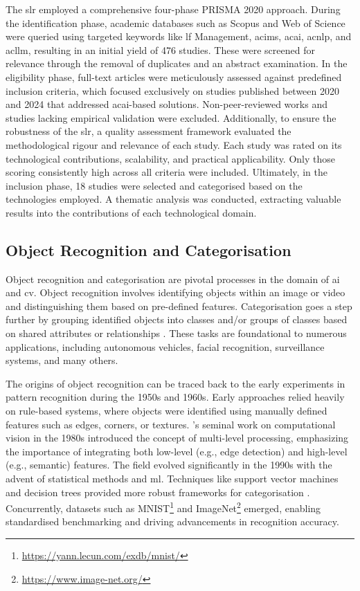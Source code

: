 The \ac{slr} employed a comprehensive four-phase PRISMA 2020 approach. During the identification phase, academic databases such as Scopus and Web of Science were queried using targeted keywords like \ac{lf} Management, ac{ims}, ac{ai}, ac{nlp}, and ac{llm}, resulting in an initial yield of 476 studies. These were screened for relevance through the removal of duplicates and an abstract examination. In the eligibility phase, full-text articles were meticulously assessed against predefined inclusion criteria, which focused exclusively on studies published between 2020 and 2024 that addressed ac{ai}-based solutions. Non-peer-reviewed works and studies lacking empirical validation were excluded. Additionally, to ensure the robustness of the \ac{slr}, a quality assessment framework evaluated the methodological rigour and relevance of each study. Each study was rated on its technological contributions, scalability, and practical applicability. Only those scoring consistently high across all criteria were included. Ultimately, in the inclusion phase, 18 studies were selected and categorised based on the technologies employed. A thematic analysis was conducted, extracting valuable results into the contributions of each technological domain.

\subsection{Object Recognition and Categorisation} \label{subsec:object-recognition}

Object recognition and categorisation are pivotal processes in the domain of \ac{ai} and \ac{cv}. Object recognition involves identifying objects within an image or video and distinguishing them based on pre-defined features. Categorisation goes a step further by grouping identified objects into classes and/or groups of classes based on shared attributes or relationships \cite{Liu2021}. These tasks are foundational to numerous applications, including autonomous vehicles, facial recognition, surveillance systems, and many others.

The origins of object recognition can be traced back to the early experiments in pattern recognition during the 1950s and 1960s. Early approaches relied heavily on rule-based systems, where objects were identified using manually defined features such as edges, corners, or textures. 's seminal work on computational vision in the 1980s introduced the concept of multi-level processing, emphasizing the importance of integrating both low-level (e.g., edge detection) and high-level (e.g., semantic) features. The field evolved significantly in the 1990s with the advent of statistical methods and \ac{ml}. Techniques like support vector machines and decision trees provided more robust frameworks for categorisation \cite{Bishop2006}. Concurrently, datasets such as MNIST\footnote{\url{https://yann.lecun.com/exdb/mnist/}} and ImageNet\footnote{\url{https://www.image-net.org/}} emerged, enabling standardised benchmarking and driving advancements in recognition accuracy.

